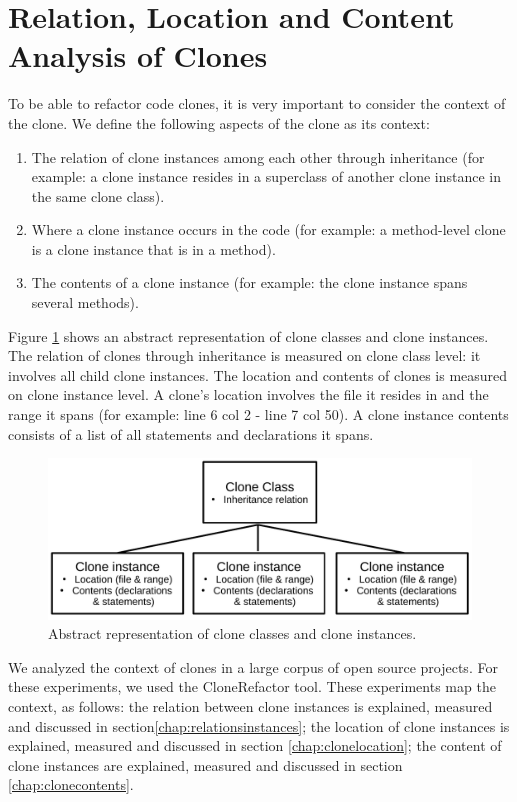 \documentclass[a4paper]{article}
\begin{document}
\section{Relation, Location and Content Analysis of Clones}\label{chap:clonecontextexpl}
To be able to refactor code clones, it is very important to consider the context of the clone. We define the following aspects of the clone as its context:
\begin{enumerate}
  \item The relation of clone instances among each other through inheritance (for example: a clone instance resides in a superclass of another clone instance in the same clone class).
  \item Where a clone instance occurs in the code (for example: a method-level clone is a clone instance that is in a method).
  \item The contents of a clone instance (for example: the clone instance spans several methods).
\end{enumerate}
Figure \ref{fig:clonecontext} shows an abstract representation of clone classes and clone instances. The relation of clones through inheritance is measured on clone class level: it involves all child clone instances. The location and contents of clones is measured on clone instance level. A clone's location involves the file it resides in and the range it spans (for example: line 6 col 2 - line 7 col 50). A clone instance contents consists of a list of all statements and declarations it spans.
\begin{figure}[H]
    \includegraphics[width=1\columnwidth]{img/context}
  \caption{Abstract representation of clone classes and clone instances.}
  \label{fig:clonecontext}
\end{figure}
We analyzed the context of clones in a large corpus of open source projects. For these experiments, we used the CloneRefactor tool. These experiments map the context, as follows: the relation between clone instances is explained, measured and discussed in section\ref{chap:relationsinstances}; the location of clone instances is explained, measured and discussed in section \ref{chap:clonelocation};  the content of clone instances are explained, measured and discussed in section \ref{chap:clonecontents}.
\end{document}
